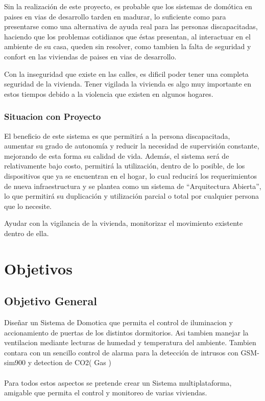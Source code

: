\documentclass[letterpaper,12pt]{article}
\begin{document}
{		Sin la realización de este proyecto, es probable que los sistemas de domótica  en paises en vias de desarrollo tarden en madurar, lo suficiente como para presentarse como una alternativa de ayuda real para las personas discapacitadas, haciendo que los problemas cotidianos que éstas presentan, al interactuar en el ambiente de su casa, queden sin resolver, como tambien la falta de seguridad y confort en las viviendas de paises en vias de desarrollo.
		
		Con la inseguridad que existe en las calles, es dificil poder tener una completa seguridad de la vivienda.
		Tener vigilada la vivienda es algo muy importante en estos tiempos debido a la violencia que existen en algunos hogares.
		
		\subsubsection{Situacion con Proyecto}
		El beneficio de este sistema es que permitirá a la persona discapacitada, aumentar su grado de autonomía y reducir la necesidad de supervisión constante, mejorando de esta forma su calidad de vida.  Además, el sistema será de relativamente bajo costo, permitirá la utilización, dentro de lo posible, de los dispositivos que ya se encuentran en el hogar, lo cual reducirá los requerimientos de nueva infraestructura y se plantea como un sistema de “Arquitectura Abierta”, lo que permitirá su duplicación y  utilización parcial o total por cualquier persona que lo necesite. 
		
		Ayudar con la vigilancia de la vivienda, monitorizar el movimiento existente dentro de ella.
		
		
		\section{Objetivos}
		
		
		
		
		\subsection{Objetivo General}
		
		Diseñar un Sistema de Domotica que permita el control de  iluminacion y accionamiento de puertas de los distintos dormitorios.
		Asi tambien manejar la ventilacion mediante lecturas de humedad y temperatura del ambiente. Tambien contara con un sencillo control de alarma para la detección de intrusos con GSM-sim900  y detection de CO2( Gas )\\\\
		Para todos estos aspectos se pretende crear un Sistema multiplataforma, amigable que permita el control y monitoreo de varias viviendas.
		
}
\end{document}
